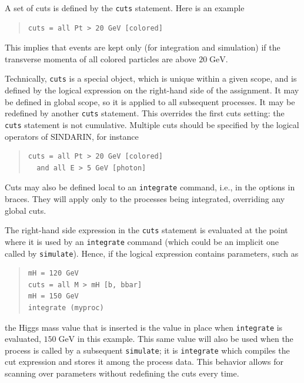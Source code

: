 \documentclass[12pt]{book}
\newcommand{\ttt}[1]{\texttt{#1}}
\newcommand{\GeV}{\textrm{GeV}}
\begin{document}
A set of cuts is defined by the \ttt{cuts} statement.  Here is an example
\begin{quote}
\begin{footnotesize}
\begin{verbatim}
cuts = all Pt > 20 GeV [colored]  
\end{verbatim}
\end{footnotesize}
\end{quote}
This implies that events are kept only (for integration and simulation) if the
transverse momenta of all colored particles are above $20\;\GeV$.

Technically, \ttt{cuts} is a special object, which is unique within a given
scope, and is defined by the logical expression on the right-hand side of the
assignment.  It may be defined in global scope, so it is applied to all
subsequent processes.  It may be redefined by another \ttt{cuts} statement.
This overrides the first cuts setting: the \ttt{cuts} statement is not
cumulative.  Multiple cuts should be specified by the logical operators of
SINDARIN, for instance
\begin{quote}
\begin{footnotesize}
\begin{verbatim}
cuts = all Pt > 20 GeV [colored]  
  and all E > 5 GeV [photon]
\end{verbatim}
\end{footnotesize}
\end{quote}
Cuts may also be defined local to an \ttt{integrate} command, i.e., in the
options in braces.   They will apply only to the processes being integrated,
overriding any global cuts.

The right-hand side expression in the \ttt{cuts} statement is evaluated at the
point where it is used by an \ttt{integrate} command (which could be an
implicit one called by \ttt{simulate}).  Hence, if the logical expression
contains parameters, such as
\begin{quote}
\begin{footnotesize}
\begin{verbatim}
mH = 120 GeV
cuts = all M > mH [b, bbar]
mH = 150 GeV
integrate (myproc)
\end{verbatim}
\end{footnotesize}
\end{quote}
the Higgs mass value that is inserted is the value in place when
\ttt{integrate} is evaluated, $150\;\GeV$ in this example.  This same value
will also be used when the process is called by a subsequent \ttt{simulate};
it is \ttt{integrate} which compiles the cut expression and stores it among
the process data.  This behavior allows for scanning over parameters without
redefining the cuts every time.
\end{document}
